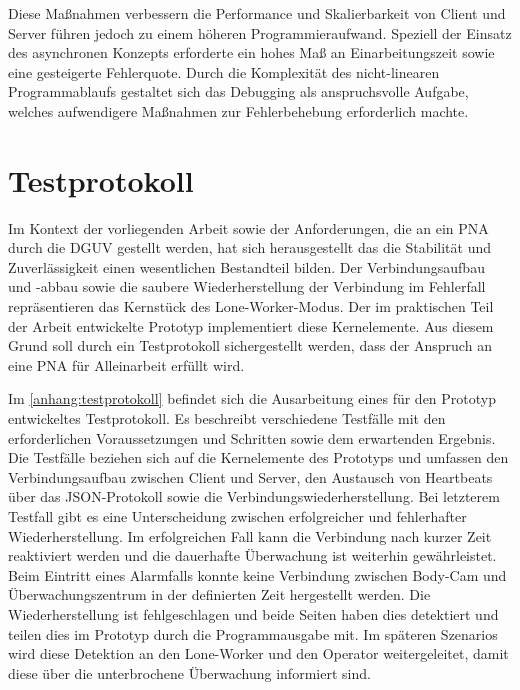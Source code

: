 \documentclass[thesis.tex]{subfiles}
\begin{document}
Diese Maßnahmen verbessern die Performance und Skalierbarkeit von Client und Server führen jedoch zu einem höheren Programmieraufwand.
Speziell der Einsatz des asynchronen Konzepts erforderte ein hohes Maß an Einarbeitungszeit sowie eine gesteigerte Fehlerquote.
Durch die Komplexität des nicht-linearen Programmablaufs gestaltet sich das Debugging als anspruchsvolle Aufgabe, welches aufwendigere Maßnahmen zur Fehlerbehebung erforderlich machte.

\section{Testprotokoll}

Im Kontext der vorliegenden Arbeit sowie der Anforderungen, die an ein PNA durch die DGUV gestellt werden, hat sich herausgestellt das die Stabilität und Zuverlässigkeit einen wesentlichen Bestandteil bilden.
Der Verbindungsaufbau und -abbau sowie die saubere Wiederherstellung der Verbindung im Fehlerfall repräsentieren das Kernstück des Lone-Worker-Modus.
Der im praktischen Teil der Arbeit entwickelte Prototyp implementiert diese Kernelemente.
Aus diesem Grund soll durch ein Testprotokoll sichergestellt werden, dass der Anspruch an eine PNA für Alleinarbeit erfüllt wird.

Im \autoref{anhang:testprotokoll} befindet sich die Ausarbeitung eines für den Prototyp entwickeltes Testprotokoll.
Es beschreibt verschiedene Testfälle mit den erforderlichen Voraussetzungen und Schritten sowie dem erwartenden Ergebnis.
Die Testfälle beziehen sich auf die Kernelemente des Prototyps und umfassen den Verbindungsaufbau zwischen Client und Server,
den Austausch von Heartbeats über das JSON-Protokoll sowie die Verbindungswiederherstellung.
Bei letzterem Testfall gibt es eine Unterscheidung zwischen erfolgreicher und fehlerhafter Wiederherstellung.
Im erfolgreichen Fall kann die Verbindung nach kurzer Zeit reaktiviert werden und die dauerhafte Überwachung ist weiterhin gewährleistet.
Beim Eintritt eines Alarmfalls konnte keine Verbindung zwischen Body-Cam und Überwachungszentrum in der definierten Zeit hergestellt werden.
Die Wiederherstellung ist fehlgeschlagen und beide Seiten haben dies detektiert und teilen dies im Prototyp durch die Programmausgabe mit.
Im späteren Szenarios wird diese Detektion an den Lone-Worker und den Operator weitergeleitet, damit diese über die unterbrochene Überwachung informiert sind.
\end{document}
